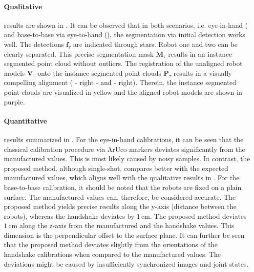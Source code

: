 \paragraph{Qualitative} results are shown in . It can be observed that in both scenarios, i.e. eye-in-hand ( and base-to-base via eye-to-hand (), the segmentation via initial detection works well. The detections $\mathbf{f}_\tau$ are indicated through stars. Robot one and two can be clearly separated. This precise segmentation mask $\mathbf{M}_\tau$ results in an instance segmented point cloud without outliers. The registration of the unaligned robot models $\mathbf{V}_\tau$ onto the instance segmented point clouds $\mathbf{P}_\tau$ results in a visually compelling alignment ( - right - and  - right). Therein, the instance segmented point clouds are visualized in yellow and the aligned robot models are shown in purple.

\paragraph{Quantitative} results summarized in . For the eye-in-hand calibrations, it can be seen that the classical calibration procedure via ArUco markers deviates significantly from the manufactured values. This is most likely caused by noisy samples. In contrast, the proposed method, although single-shot, compares better with the expected manufactured values, which aligns well with the qualitative results in . For the base-to-base calibration, it should be noted that the robots are fixed on a plain surface. The manufactured values can, therefore, be considered accurate. The proposed method yields precise results along the y-axis (distance between the robots), whereas the handshake deviates by $1\,\text{cm}$. The proposed method deviates $1\,\text{cm}$ along the z-axis from the manufactured and the handshake values. This dimension is the perpendicular offset to the surface plane. It can further be seen that the proposed method deviates slightly from the orientations of the handshake calibrations when compared to the manufactured values. The deviations might be caused by insufficiently synchronized images and joint states.


